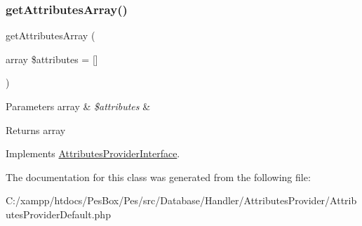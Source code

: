 \subsubsection{\texorpdfstring{get\+Attributes\+Array()}{getAttributesArray()}}
{\footnotesize\ttfamily get\+Attributes\+Array (\begin{DoxyParamCaption}\item[{array}]{\$attributes = {\ttfamily \mbox{[}\mbox{]}} }\end{DoxyParamCaption})}


\begin{DoxyParams}[1]{Parameters}
array & {\em \$attributes} & \\
\hline
\end{DoxyParams}
\begin{DoxyReturn}{Returns}
array 
\end{DoxyReturn}


Implements \mbox{\hyperlink{interface_pes_1_1_database_1_1_handler_1_1_attributes_provider_1_1_attributes_provider_interface}{Attributes\+Provider\+Interface}}.



The documentation for this class was generated from the following file\+:\begin{DoxyCompactItemize}
\item 
C\+:/xampp/htdocs/\+Pes\+Box/\+Pes/src/\+Database/\+Handler/\+Attributes\+Provider/Attributes\+Provider\+Default.\+php\end{DoxyCompactItemize}
